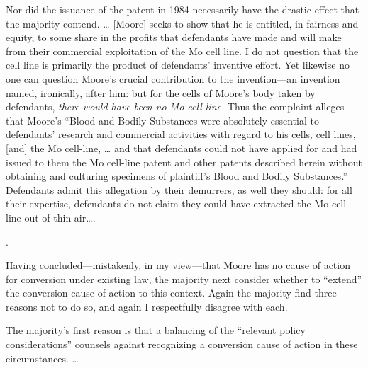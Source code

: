 Nor did the issuance of the patent in 1984 necessarily have the drastic effect
that the majority contend. {\dots} [Moore] seeks to show that he is entitled,
in fairness and equity, to some share in the profits that defendants have made
and will make from their commercial exploitation of the Mo cell line. I do not
question that the cell line is primarily the product of defendants' inventive
effort. Yet likewise no one can question Moore's crucial contribution to the
invention---an invention named, ironically, after him: but for the cells of
Moore's body taken by defendants, \textit{there would have been no Mo cell
line.} Thus the complaint alleges that Moore's ``Blood and Bodily Substances
were absolutely essential to defendants' research and commercial activities
with regard to his cells, cell lines, [and] the Mo cell-line,  {\dots}  and
that defendants could not have applied for and had issued to them the Mo
cell-line patent and other patents described herein without obtaining and
culturing specimens of plaintiff's Blood and Bodily Substances.'' Defendants
admit this allegation by their demurrers, as well they should: for all their
expertise, defendants do not claim they could have extracted the Mo cell line
out of thin air{\dots}.

{.
\par}

Having concluded---mistakenly, in my view---that Moore has no cause of action
for conversion under existing law, the majority next consider whether to
``extend'' the conversion cause of action to this context. Again the majority
find three reasons not to do so, and again I respectfully disagree with each.

The majority's first reason is that a balancing of the ``relevant policy
considerations'' counsels against recognizing a conversion cause of action in
these circumstances.  {\dots}  

